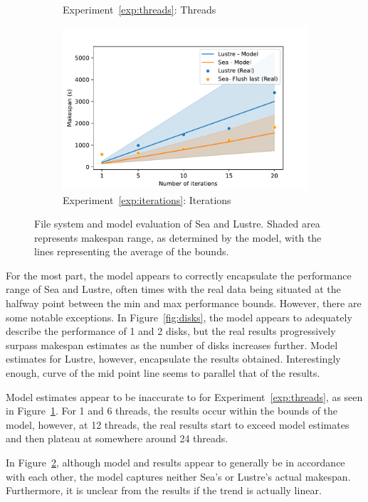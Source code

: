 \documentclass{report}
\begin{document}
\begin{figure}
\begin{subfigure}{0.5\textwidth}
            \caption{Experiment~\ref{exp:threads}: Threads}
            \label{fig:threads}
        \end{subfigure}
        \begin{subfigure}{0.5\textwidth}
            \centering
            \includegraphics[width=0.8\linewidth]{figures/iterations.pdf}
            \caption{Experiment~\ref{exp:iterations}: Iterations}
            \label{fig:iterations}
        \end{subfigure}
        \caption{File system and model evaluation of Sea and Lustre. Shaded
        area represents makespan range, as determined by the model, with the
        lines representing the average of the bounds.}

    \label{fig:seaexp}
\end{figure}
    For the most part, the model appears to correctly encapsulate the
    performance range of Sea and Lustre, often times with the real data being
    situated at the halfway point between the min and max performance bounds.
    However, there are some notable exceptions.
    In Figure~\ref{fig:disks}, the model appears to adequately describe the
    performance of 1 and 2 disks, but the real results progressively surpass
    makespan estimates as the number of disks increases further. Model estimates
    for Lustre, however, encapsulate the results obtained. Interestingly
    enough, curve of the mid point line seems to parallel that of the results.

    Model estimates appear to be inaccurate to for Experiment~\ref{exp:threads}, as seen in
    Figure~\ref{fig:threads}. For 1 and 6 threads, the results occur within
    the bounds of the model, however, at 12 threads, the real results start
    to exceed model estimates and then plateau at somewhere around 24 threads.

    In Figure~\ref{fig:iterations}, although model and results appear to
    generally be in accordance with each other, the model captures neither
    Sea's or Lustre's actual makespan. Furthermore, it is unclear from the
    results if the trend is actually linear.
\end{document}

